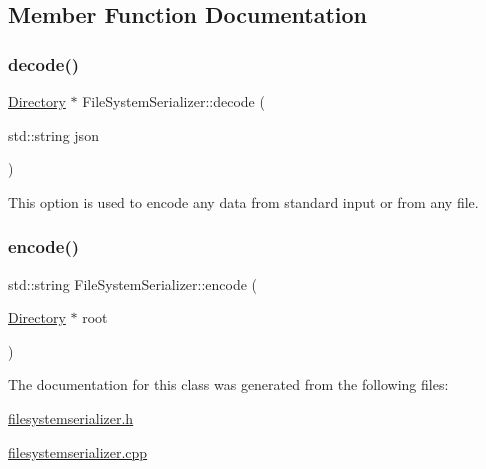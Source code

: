 \subsection{Member Function Documentation}
\mbox{\label{class_file_system_serializer_a9a32306fcb9133696c1b5f795eaa1933}} 
\subsubsection{\texorpdfstring{decode()}{decode()}}
{\footnotesize\ttfamily \hyperlink{class_directory}{Directory} $\ast$ File\+System\+Serializer\+::decode (\begin{DoxyParamCaption}\item[{std\+::string}]{json }\end{DoxyParamCaption})\hspace{0.3cm}{\ttfamily [static]}}

This option is used to encode any data from standard input or from any file. \mbox{\label{class_file_system_serializer_aef096d9b5936bddd4beac3dc9181c28f}} 
\subsubsection{\texorpdfstring{encode()}{encode()}}
{\footnotesize\ttfamily std\+::string File\+System\+Serializer\+::encode (\begin{DoxyParamCaption}\item[{\hyperlink{class_directory}{Directory} $\ast$}]{root }\end{DoxyParamCaption})\hspace{0.3cm}{\ttfamily [static]}}



The documentation for this class was generated from the following files\+:\begin{DoxyCompactItemize}
\item 
\hyperlink{filesystemserializer_8h}{filesystemserializer.\+h}\item 
\hyperlink{filesystemserializer_8cpp}{filesystemserializer.\+cpp}\end{DoxyCompactItemize}
